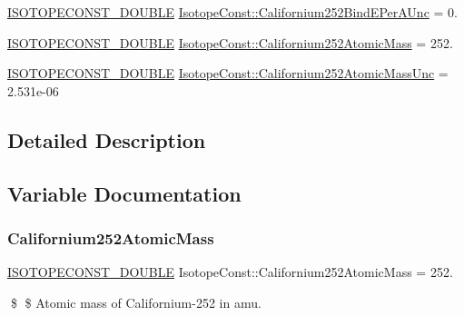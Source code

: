 \begin{DoxyCompactItemize}
\item 
\mbox{\hyperlink{group___isotope_const-_macros_ga8f45a7272ce02c0b4c65c44636ed719a}{I\+S\+O\+T\+O\+P\+E\+C\+O\+N\+S\+T\+\_\+\+D\+O\+U\+B\+LE}} \mbox{\hyperlink{group___isotope_const-_californium-_cf252_gabd008af6fb53811e77e23c932ad56197}{Isotope\+Const\+::\+Californium252\+Bind\+E\+Per\+A\+Unc}} = 0.
\item 
\mbox{\hyperlink{group___isotope_const-_macros_ga8f45a7272ce02c0b4c65c44636ed719a}{I\+S\+O\+T\+O\+P\+E\+C\+O\+N\+S\+T\+\_\+\+D\+O\+U\+B\+LE}} \mbox{\hyperlink{group___isotope_const-_californium-_cf252_gab260c3ba2ca36aefe415a61fbf4d498a}{Isotope\+Const\+::\+Californium252\+Atomic\+Mass}} = 252.
\item 
\mbox{\hyperlink{group___isotope_const-_macros_ga8f45a7272ce02c0b4c65c44636ed719a}{I\+S\+O\+T\+O\+P\+E\+C\+O\+N\+S\+T\+\_\+\+D\+O\+U\+B\+LE}} \mbox{\hyperlink{group___isotope_const-_californium-_cf252_ga242f7f20181d3474afc8daa5a1166bef}{Isotope\+Const\+::\+Californium252\+Atomic\+Mass\+Unc}} = 2.\+531e-\/06
\end{DoxyCompactItemize}


\subsection{Detailed Description}


\subsection{Variable Documentation}
\mbox{\label{group___isotope_const-_californium-_cf252_gab260c3ba2ca36aefe415a61fbf4d498a}} 
\subsubsection{\texorpdfstring{Californium252\+Atomic\+Mass}{Californium252AtomicMass}}
{\footnotesize\ttfamily \mbox{\hyperlink{group___isotope_const-_macros_ga8f45a7272ce02c0b4c65c44636ed719a}{I\+S\+O\+T\+O\+P\+E\+C\+O\+N\+S\+T\+\_\+\+D\+O\+U\+B\+LE}} Isotope\+Const\+::\+Californium252\+Atomic\+Mass = 252.}

\$ \$ Atomic mass of Californium-\/252 in amu. \mbox{\label{group___isotope_const-_californium-_cf252_ga242f7f20181d3474afc8daa5a1166bef}} 
